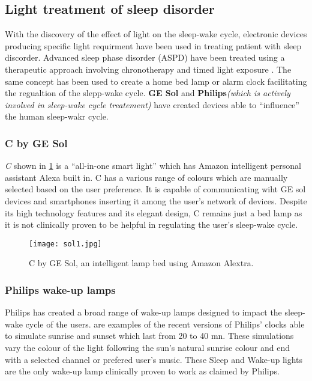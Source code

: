 \subsection{Light treatment of sleep disorder}
With the discovery of the effect of light on the sleep-wake cycle, electronic devices producing specific light requirment have been used in treating patient with sleep discorder. Advanced sleep phase disorder (ASPD) have been treated using a therapeutic approach involving chronotherapy and timed light exposure \cite{th2010}. The same concept has been used to create a home bed lamp or alarm clock facilitating the regualtion of the slepp-wake cycle. \textbf{GE Sol} and \textbf{Philips}\textit{(which is actively involved in sleep-wake cycle treatement)} have created devices able to ``influence'' the human sleep-wakr cycle.

\subsubsection{C by GE Sol}
\textit{C} shown in \cref{fig:c} is a ``all-in-one smart light'' \cite{gesol} which has Amazon intelligent personal assistant Alexa built in. C has a various range of colours which are manually selected based on the user preference. It is capable of communicating wiht GE sol devices and smartphones inserting it among the user's network of devices. Despite its high technology features and its elegant design, C remains just a bed lamp as it is not clinically proven to be helpful in regulating the user's sleep-wake cycle.
\begin{figure}[h!]
\centering
\texttt{[image: sol1.jpg]}
\caption{C by GE Sol, an intelligent lamp bed using Amazon Alextra.}
\label{fig:c}
\end{figure}

\subsubsection{Philips wake-up lamps}
Philips has created a broad range of wake-up lamps designed to impact the sleep-wake cycle of the users.  are examples of the recent versions of Philips' clocks able to simulate sunrise and sunset which last from 20 to 40 mn. These simulations vary the colour of the light following the sun's natural sunrise colour and end with a selected channel or prefered user's music. These Sleep and Wake-up lights are the only wake-up lamp clinically proven to work as claimed by Philips\cite{philips}. 

